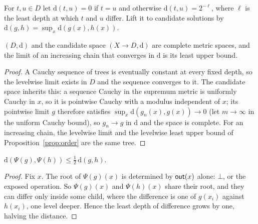 \begin{definition}\label{def:metric}
  For $t, u \in D$ let $\mathrm{d}(t, u) = 0$ if $t = u$ and otherwise $\mathrm{d}(t, u) = 2^{-\ell}$, where $\ell$ is the least depth at which $t$ and $u$ differ. Lift it to candidate solutions by $\mathrm{d}(g, h) = \sup_x \mathrm{d}(g(x), h(x))$.
\end{definition}

\begin{lemma}[Completeness]\label{lem:metric}
  $(D, \mathrm{d})$ and the candidate space $(X \to D, \mathrm{d})$ are complete metric spaces, and the limit of an increasing chain that converges in $\mathrm{d}$ is its least upper bound.
\end{lemma}
\begin{proof}
  A Cauchy sequence of trees is eventually constant at every fixed depth, so the levelwise limit exists in $D$ and the sequence converges to it. The candidate space inherits this: a sequence Cauchy in the supremum metric is uniformly Cauchy in $x$, so it is pointwise Cauchy with a modulus independent of $x$; its pointwise limit $g$ therefore satisfies $\sup_x \mathrm{d}(g_n(x), g(x)) \to 0$ (let $m \to \infty$ in the uniform Cauchy bound), so $g_n \to g$ in $\mathrm{d}$ and the space is complete. For an increasing chain, the levelwise limit and the levelwise least upper bound of Proposition~\ref{prop:order} are the same tree.
\end{proof}

\begin{lemma}[Guardedness]\label{lem:guarded}
  $\mathrm{d}(\Psi(g), \Psi(h)) \le \tfrac{1}{2}\,\mathrm{d}(g, h)$.
\end{lemma}
\begin{proof}
  Fix $x$. The root of $\Psi(g)(x)$ is determined by $\mathsf{out}(x)$ alone: $\bot$, or the exposed operation. So $\Psi(g)(x)$ and $\Psi(h)(x)$ share their root, and they can differ only inside some child, where the difference is one of $g(x_i)$ against $h(x_i)$, one level deeper. Hence the least depth of difference grows by one, halving the distance.
\end{proof}

